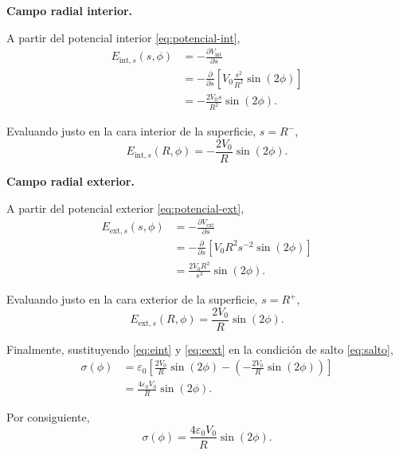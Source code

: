\documentclass[11pt]{article}
\begin{document}
\medskip

\textbf{Campo radial interior.}\par

A partir del potencial interior \eqref{eq:potencial-int},
\begin{align*}
    E_{\text{int},s}(s,\phi)
    &=
    -\frac{\partial V_{\text{int}}}{\partial s}
    \\
    &=
    -\frac{\partial}{\partial s}
    \left[
        V_0\frac{s^2}{R^2}\sin(2\phi)
    \right]
    \\
    &=
    -\frac{2V_0s}{R^2}\sin(2\phi).
\end{align*}

Evaluando justo en la cara interior de la superficie, $s=R^{-}$,
\begin{equation}\label{eq:eint}
    E_{\text{int},s}(R,\phi)
    =
    -\frac{2V_0}{R}\sin(2\phi).
\end{equation}

\medskip

\textbf{Campo radial exterior.}\par

A partir del potencial exterior \eqref{eq:potencial-ext},
\begin{align*}
    E_{\text{ext},s}(s,\phi)
    &=
    -\frac{\partial V_{\text{ext}}}{\partial s}
    \\
    &=
    -\frac{\partial}{\partial s}
    \left[
        V_0R^2s^{-2}\sin(2\phi)
    \right]
    \\
    &=
    \frac{2V_0R^2}{s^3}\sin(2\phi).
\end{align*}

Evaluando justo en la cara exterior de la superficie, $s=R^{+}$,
\begin{equation}\label{eq:eext}
    E_{\text{ext},s}(R,\phi)
    =
    \frac{2V_0}{R}\sin(2\phi).
\end{equation}

Finalmente, sustituyendo \eqref{eq:eint} y \eqref{eq:eext} en la condición
de salto \eqref{eq:salto},
\begin{align*}
    \sigma(\phi)
    &=
    \varepsilon_0
    \left[
        \frac{2V_0}{R}\sin(2\phi)
        -
        \left(
            -\frac{2V_0}{R}\sin(2\phi)
        \right)
    \right]
    \\
    &=
    \frac{4\varepsilon_0V_0}{R}\sin(2\phi).
\end{align*}

Por consiguiente,
\begin{equation}\label{eq:sigma}
    \boxed{
        \sigma(\phi)
        =
        \frac{4\varepsilon_0V_0}{R}\sin(2\phi)
    }.
\end{equation}
\end{document}

